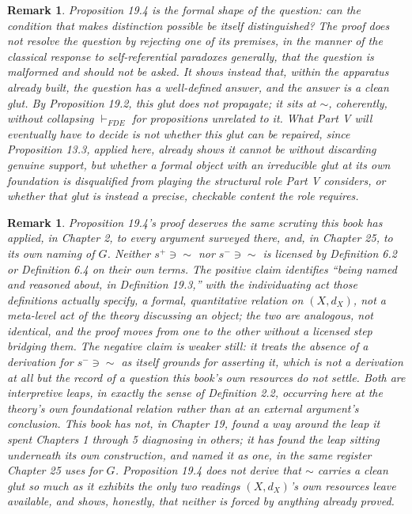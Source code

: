 \documentclass[11pt]{book}
\newtheorem{remark}[theorem]{Remark}
\begin{document}
\begin{remark}
Proposition 19.4 is the formal shape of the question: can the condition that makes distinction possible be itself distinguished? The proof does not resolve the question by rejecting one of its premises, in the manner of the classical response to self-referential paradoxes generally, that the question is malformed and should not be asked. It shows instead that, within the apparatus already built, the question has a well-defined answer, and the answer is a clean glut. By Proposition 19.2, this glut does not propagate; it sits at $\sim$, coherently, without collapsing $\vdash_{FDE}$ for propositions unrelated to it. What Part V will eventually have to decide is not whether this glut can be repaired, since Proposition 13.3, applied here, already shows it cannot be without discarding genuine support, but whether a formal object with an irreducible glut at its own foundation is disqualified from playing the structural role Part V considers, or whether that glut is instead a precise, checkable content the role requires.
\end{remark}

\begin{remark}
Proposition 19.4's proof deserves the same scrutiny this book has applied, in Chapter 2, to every argument surveyed there, and, in Chapter 25, to its own naming of $G$. Neither $s^+ \ni \sim$ nor $s^- \ni \sim$ is licensed by Definition 6.2 or Definition 6.4 on their own terms. The positive claim identifies ``being named and reasoned about, in Definition 19.3,'' with the individuating act those definitions actually specify, a formal, quantitative relation on $(X, d_X)$, not a meta-level act of the theory discussing an object; the two are analogous, not identical, and the proof moves from one to the other without a licensed step bridging them. The negative claim is weaker still: it treats the \emph{absence} of a derivation for $s^- \ni \sim$ as itself grounds for asserting it, which is not a derivation at all but the record of a question this book's own resources do not settle. Both are interpretive leaps, in exactly the sense of Definition 2.2, occurring here at the theory's own foundational relation rather than at an external argument's conclusion. This book has not, in Chapter 19, found a way around the leap it spent Chapters 1 through 5 diagnosing in others; it has found the leap sitting underneath its own construction, and named it as one, in the same register Chapter 25 uses for $G$. Proposition 19.4 does not derive that $\sim$ carries a clean glut so much as it exhibits the only two readings $(X, d_X)$'s own resources leave available, and shows, honestly, that neither is forced by anything already proved.
\end{remark}
\end{document}
